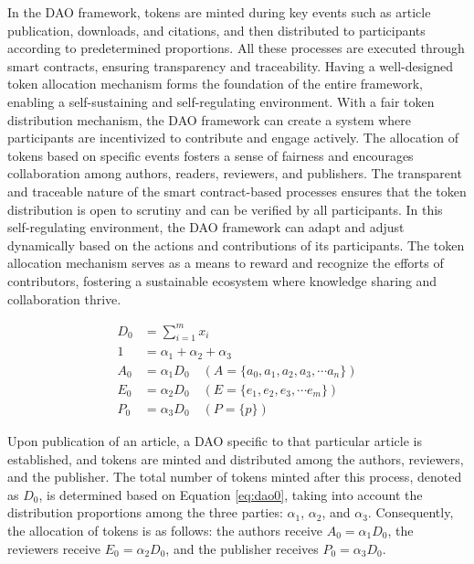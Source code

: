 \documentclass[lettersize,journal]{IEEEtran}
\begin{document}
In the DAO framework, tokens are minted during key events such as article publication, downloads, and citations, and then distributed to participants according to predetermined proportions. All these processes are executed through smart contracts, ensuring transparency and traceability. Having a well-designed token allocation mechanism forms the foundation of the entire framework, enabling a self-sustaining and self-regulating environment.
With a fair token distribution mechanism, the DAO framework can create a system where participants are incentivized to contribute and engage actively. The allocation of tokens based on specific events fosters a sense of fairness and encourages collaboration among authors, readers, reviewers, and publishers. The transparent and traceable nature of the smart contract-based processes ensures that the token distribution is open to scrutiny and can be verified by all participants.
In this self-regulating environment, the DAO framework can adapt and adjust dynamically based on the actions and contributions of its participants. The token allocation mechanism serves as a means to reward and recognize the efforts of contributors, fostering a sustainable ecosystem where knowledge sharing and collaboration thrive.

\begin{equation}
  \begin{aligned}
    D_0 &= \sum_{i = 1}^{m}x_i \\
    1 &= \alpha_1 + \alpha_2 + \alpha_3 \\
    A_0 &= \alpha_1 D_0 \quad (A=\{a_0, a_1, a_2, a_3, \cdots a_n\}) \\
    E_0 &= \alpha_2 D_0 \quad (E=\{e_1, e_2, e_3, \cdots e_m\}) \\
    P_0 &= \alpha_3 D_0 \quad (P=\{p\})
  \end{aligned}
  \label{eq:dao0}
\end{equation}

Upon publication of an article, a DAO specific to that particular article is established, and tokens are minted and distributed among the authors, reviewers, and the publisher. The total number of tokens minted after this process, denoted as $D_0$, is determined based on Equation \ref{eq:dao0}, taking into account the distribution proportions among the three parties: $\alpha_1$, $\alpha_2$, and $\alpha_3$. Consequently, the allocation of tokens is as follows: the authors receive $A_0 = \alpha_1 D_0$, the reviewers receive $E_0 = \alpha_2 D_0$, and the publisher receives $P_0 = \alpha_3 D_0$.
\end{document}
